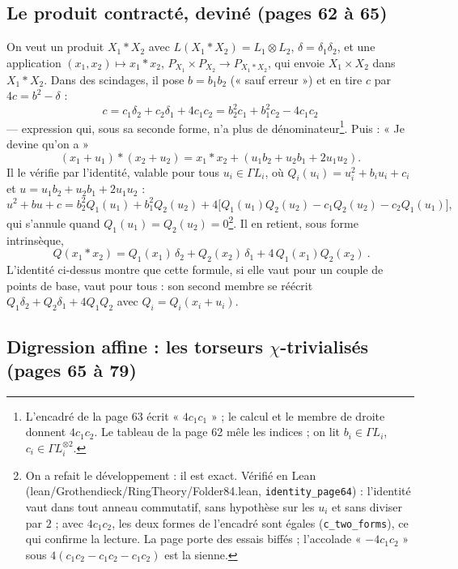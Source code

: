 \documentclass[11pt,a4paper]{article}
\begin{document}
\subsection*{Le produit contracté, deviné (pages 62 à 65)}

On veut un produit $X_1 * X_2$ avec $L(X_1 * X_2) = L_1 \otimes L_2$, $\delta = \delta_1\delta_2$,
et une application $(x_1, x_2) \mapsto x_1 * x_2$, $P_{X_1} \times P_{X_2} \to P_{X_1 *
X_2}$, qui envoie $X_1 \times X_2$ dans $X_1 * X_2$. Dans des scindages, il pose
$b = b_1b_2$ (« sauf erreur ») et en tire $c$ par $4c = b^{2} - \delta$ :
\[
  \boxed{\ c = c_1\delta_2 + c_2\delta_1 + 4c_1c_2 = b_2^{2}c_1 + b_1^{2}c_2 - 4c_1c_2\ }
\]
--- expression qui, sous sa seconde forme, n'a plus de dénominateur\footnote{L'encadré
de la page 63 écrit « $4c_1c_1$ » ; le calcul et le membre de droite donnent
$4c_1c_2$. Le tableau de la page 62 mêle les indices ; on lit $b_i \in \Gamma L_i$,
$c_i \in \Gamma L_i^{\otimes 2}$.}. Puis : « Je devine qu'on a »
\[
  (x_1 + u_1) * (x_2 + u_2) = x_1 * x_2 + (u_1b_2 + u_2b_1 + 2u_1u_2).
\]
Il le vérifie par l'identité, valable pour tous $u_i \in \Gamma L_i$, où
$Q_i(u_i) = u_i^{2} + b_iu_i + c_i$ et $u = u_1b_2 + u_2b_1 + 2u_1u_2$ :
\[
  u^{2} + bu + c = b_2^{2}Q_1(u_1) + b_1^{2}Q_2(u_2) + 4\bigl[Q_1(u_1)Q_2(u_2) - c_1Q_2(u_2) - c_2Q_1(u_1)\bigr],
\]
qui s'annule quand $Q_1(u_1) = Q_2(u_2) = 0$\footnote{On a refait le développement :
il est exact. Vérifié en Lean (lean/Grothendieck/RingTheory/Folder84.lean,
\texttt{identity\_page64}) : l'identité vaut dans tout anneau commutatif, sans
hypothèse sur les $u_i$ et sans diviser par $2$ ; avec $4c_1c_2$, les deux formes de
l'encadré sont égales (\texttt{c\_two\_forms}), ce qui confirme la lecture. La page porte des essais biffés ; l'accolade « $-4c_1c_2$ » sous
$4(c_1c_2 - c_1c_2 - c_1c_2)$ est la sienne.}. Il en retient, sous forme
intrinsèque,
\[
  \boxed{\ Q(x_1 * x_2) = Q_1(x_1)\,\delta_2 + Q_2(x_2)\,\delta_1 + 4\,Q_1(x_1)Q_2(x_2)\ } .
\]
L'identité ci-dessus montre que cette formule, si elle vaut pour un couple de
points de base, vaut pour tous : son second membre se réécrit
$Q_1\delta_2 + Q_2\delta_1 + 4Q_1Q_2$ avec $Q_i = Q_i(x_i + u_i)$.

\subsection*{Digression affine : les torseurs $\chi$-trivialisés (pages 65 à 79)}
\end{document}
